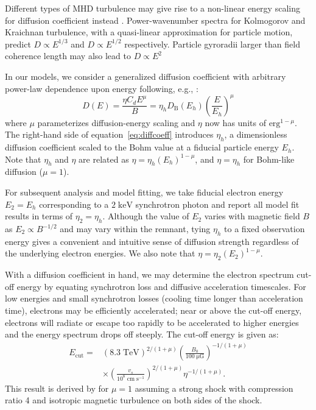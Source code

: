 \documentclass[iop, apj, numberedappendix]{emulateapj}
\newcommand*{\mt}{\mathrm}
\newcommand*{\unit}[1]{\;\mt{#1}}  %
\newcommand*{\Ecut}{E_{\mt{cut}}}
\newcommand*{\muG}{\unit{\mu G}}
\begin{document}
Different types of MHD turbulence may give rise to a non-linear energy
scaling for diffusion coefficient instead \citep{giacalone1999, reynolds2004}.
Power-wavenumber spectra for Kolmogorov and Kraichnan turbulence, with a
quasi-linear approximation for particle motion,
predict $D \propto E^{1/3}$ and $D \propto E^{1/2}$ respectively.
Particle gyroradii larger than field coherence length may also lead to
$D \propto E^{2}$ 

In our models, we consider a generalized diffusion coefficient with arbitrary
power-law dependence upon energy following, e.g., \citet{parizot2006}:
\begin{equation} \label{eq:diffcoeff}
    D(E) = \frac{\eta C_d E^\mu}{B}
         = \eta_h D_{\mt{B}}\left(E_h\right) \left(\frac{E}{E_h}\right)^\mu
\end{equation}
where $\mu$ parameterizes diffusion-energy scaling and $\eta$ now has units
of $\mt{erg}^{1-\mu}$.  The right-hand side of equation~\eqref{eq:diffcoeff}
introduces $\eta_h$, a dimensionless diffusion coefficient scaled to the Bohm
value at a fiducial particle energy $E_h$.  Note that $\eta_h$ and $\eta$ are
related as $\eta = \eta_h (E_h)^{1-\mu}$, and $\eta = \eta_h$ for Bohm-like
diffusion ($\mu = 1$).

For subsequent analysis and model fitting, we take fiducial electron energy
$E_2 = E_h$ corresponding to a $2 \unit{keV}$ synchrotron photon and report all
model fit results in terms of $\eta_2 = \eta_h$.  Although the value of $E_2$
varies with magnetic field $B$ as $E_2 \propto B^{-1/2}$ and may vary within
the remnant, tying $\eta_h$ to a fixed observation energy gives a convenient
and intuitive sense of diffusion strength regardless of the underlying electron
energies.  We also note that $\eta = \eta_2 (E_2)^{1-\mu}$.

With a diffusion coefficient in hand, we may determine the electron spectrum
cut-off energy by equating synchrotron loss and diffusive acceleration
timescales.  For low energies and small synchrotron losses (cooling time longer
than acceleration time), electrons may be efficiently accelerated; near or
above the cut-off energy, electrons will radiate or escape too rapidly to be
accelerated to higher energies and the energy spectrum drops off steeply.  The
cut-off energy is given as:
\begin{align} \label{eq:ecut}
    \Ecut =
        &\left(8.3\unit{TeV}\right)^{2/(1+\mu)}
        \left(\frac{B_0}{100 \muG}\right)^{-1/(1+\mu)} \nonumber \\
        &\times \left(\frac{v_s}{10^8 \unit{cm\;s^{-1}}}\right)^{2/(1+\mu)}
        \eta^{-1 / (1+\mu)} .
\end{align}
This result is derived by \citet{parizot2006} for $\mu=1$ assuming a strong
shock with compression ratio 4 and isotropic magnetic turbulence on both sides
of the shock.
\end{document}
